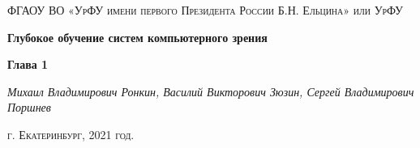\begin{titlepage}
	\centering
	{\scshape ФГАОУ ВО «УрФУ имени первого Президента России Б.Н. Ельцина» или УрФУ \par}
	\vspace{7cm}
	{\huge\bfseries Глубокое обучение систем компьютерного зрения\par}
	{\huge\bfseries Глава 1\par}	
	\vspace{7cm}
	{\Large\itshape Михаил Владимирович Ронкин, Василий Викторович Зюзин, Сергей Владимирович Поршнев \par}
	\vfill  \textsc{г. Екатеринбург, 2021 год.}

	\vfill
	
    \tableofcontents
\end{titlepage}